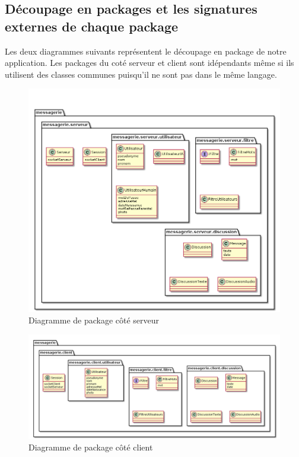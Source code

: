 \documentclass[a4paper,12pt]{article}
\begin{document}
	\newpage

	\subsection{Découpage en packages et les signatures externes de chaque package}
	Les deux diagrammes suivants représentent le découpage en package de notre application.
	Les packages du coté serveur et client sont idépendants même si ils utilisent des classes communes puisqu'il ne sont pas dans le même langage.
	\begin{figure}[H]
		\centerline{\includegraphics[width=16.5cm]{../diagrammes/img/packageServeur.png}}
		\caption{Diagramme de package côté serveur}
	\end{figure}

	\begin{figure}[H]
		\centerline{\includegraphics[width=16.5cm]{../diagrammes/img/packageClient.png}}
		\caption{Diagramme de package côté client}
	\end{figure}
\end{document}
